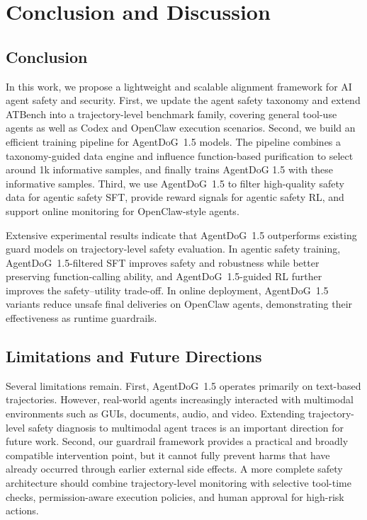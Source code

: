 \documentclass{llmxive}
\providecommand{\agentdog}{AgentDoG~1.5\xspace}
\begin{document}
\section{Conclusion and Discussion}

\subsection{Conclusion}

In this work, we propose a lightweight and scalable alignment framework for AI agent safety and security. First, we update the agent safety taxonomy and extend ATBench into a trajectory-level benchmark family, covering general tool-use agents as well as Codex and OpenClaw execution scenarios. Second, we build an efficient training pipeline for \agentdog{} models. The pipeline combines a taxonomy-guided data engine and influence function-based purification to select around 1k informative samples, and finally trains AgentDoG 1.5 with these informative samples. Third, we use \agentdog{} to filter high-quality safety data for agentic safety SFT, provide reward signals for agentic safety RL, and support online monitoring for OpenClaw-style agents.

Extensive experimental results indicate that \agentdog{} outperforms existing guard models on trajectory-level safety evaluation. In agentic safety training, \agentdog{}-filtered SFT improves safety and robustness while better preserving function-calling ability, and \agentdog{}-guided RL further improves the safety--utility trade-off. In online deployment, \agentdog{} variants reduce unsafe final deliveries on OpenClaw agents, demonstrating their effectiveness as runtime guardrails. 

\subsection{Limitations and Future Directions}

Several limitations remain. First, \agentdog{} operates primarily on text-based trajectories. However, real-world agents increasingly interacted with multimodal environments such as GUIs, documents, audio, and video. Extending trajectory-level safety diagnosis to multimodal agent traces is an important direction for future work. Second, our guardrail framework provides a practical and broadly compatible intervention point, but it cannot fully prevent harms that have already occurred through earlier external side effects. A more complete safety architecture should combine trajectory-level monitoring with selective tool-time checks, permission-aware execution policies, and human approval for high-risk actions.
\end{document}
